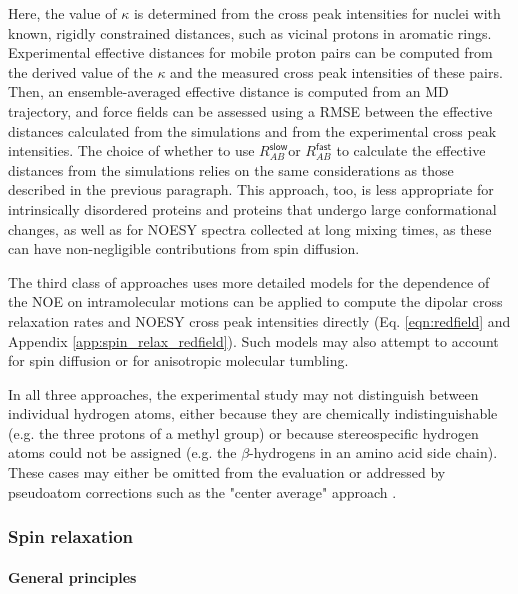 \documentclass[9pt,review]{livecoms}
\begin{document}
Here, the value of $\kappa$ is determined from the cross peak intensities for nuclei with known, rigidly constrained distances, such as vicinal protons in aromatic rings.
Experimental effective distances for mobile proton pairs can be computed from the derived value of the $\kappa$ and the measured cross peak intensities of these pairs.
Then, an ensemble-averaged effective distance is computed from an MD trajectory, and force fields can be assessed using a RMSE between the effective distances calculated from the simulations and from the experimental cross peak intensities.
The choice of whether to use $R_{AB}^{\mathsf{slow}}$or $R_{AB}^{\mathsf{fast}}$ to calculate the effective distances from the simulations relies on the same considerations as those described in the previous paragraph.
This approach, too, is less appropriate for intrinsically disordered proteins and  proteins that undergo large conformational changes, as well as for NOESY spectra collected at long mixing times, as these can have non-negligible contributions from spin diffusion.

The third class of approaches uses more detailed models for the dependence of the NOE on intramolecular motions \cite{peter_calculation_2001,vogeli_nuclear_2014} can be applied to compute the dipolar cross relaxation rates and NOESY cross peak intensities directly (Eq. \ref{eqn:redfield} and Appendix \ref{app:spin_relax_redfield}).
Such models may also attempt to account for spin diffusion or for anisotropic molecular tumbling.

In all three approaches, the experimental study may not distinguish between individual hydrogen atoms, either because they are chemically indistinguishable (e.g. the three protons of a methyl group) or because stereospecific hydrogen atoms could not be assigned (e.g. the $\beta$-hydrogens in an amino acid side chain).
These cases may either be omitted from the evaluation or addressed by pseudoatom corrections such as the "center average" approach \cite{wuthrich_pseudo-structures_1983,fletcher_treatment_1996}.

\subsubsection{Spin relaxation}
\label{sub2:spin_relax}

\paragraph{General principles}
\end{document}
